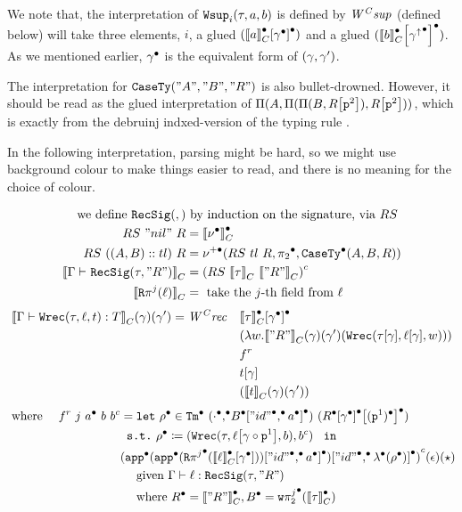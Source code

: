 We note that, the interpretation of $\texttt{Wsup}_{i}({\tau},{a},{b})$ is defined by $\mathit{W^Csup}$ (defined below) will take three elements, $i$, a glued $({{\llbracket {a} \rrbracket}_C^\bullet}\!\left[{{\gamma}^\bullet}\right]^\bullet)$ and a glued $({{\llbracket {b} \rrbracket}_C^\bullet}\!\left[{{{\gamma^\uparrow}^\bullet}}\right]^\bullet)$.  As we mentioned earlier, ${\gamma}^\bullet$ is the equivalent form of $(\gamma, \gamma')$.

The interpretation for $\texttt{CaseTy}({"A"},{"B"},{"R"})$ is also bullet-drowned. However, it should be read as the glued interpretation of $ \Pi({A},{\Pi({\Pi({B},{{R}\!\left[{\texttt{p}^{2}}\right]})},{{R}\!\left[{\texttt{p}^{2}}\right]})}) $, which is exactly from the debruinj indxed-version of the typing rule . 

In the following interpretation, parsing might be hard, so we might use background colour to make things easier to read, and there is no meaning for the choice of colour.

\begin{align*}
  \text{we define } \texttt{RecSig}({},{}) &\text{ by induction on the signature, via } RS \\
  RS~"nil"~R &= {\llbracket {\ensuremath{\nu^\bullet}} \rrbracket}_C^\bullet \\
  RS~((A, B) :: tl)~R &= \nu^{+\bullet}({RS~tl~R},{{\pi_2}^\bullet},{\texttt{CaseTy}^\bullet({A},{B},{R})}) \\ 
  {\llbracket {\ensuremath{ {\Gamma} \vdash_{} {\texttt{RecSig}({\tau},{"R"})} }} \rrbracket}_C &= {({RS~{\llbracket {\tau} \rrbracket}_C~{\llbracket {"R"} \rrbracket}_C})}^c \\
  {\llbracket {\ensuremath{\texttt{R}\pi^{j}({\ell})}} \rrbracket}_C &= \text{ take the $j$-th field from } \ell 
\end{align*}
\begin{align*}
  {\llbracket {\ensuremath{ {\Gamma} \vdash {\ensuremath{\texttt{Wrec}({\tau},{\ell},{t})}} : {T} }} \rrbracket}_C(\gamma)(\gamma') = \mathit{W^Crec} \quad &{{\llbracket {\ensuremath{\tau}} \rrbracket}_C^\bullet}\!\left[{{\gamma}^\bullet}\right]^\bullet \\ 
  & (\lambda w. {\llbracket {"R"} \rrbracket}_C(\gamma)(\gamma')(\texttt{Wrec}({{\tau}\!\left[{\gamma}\right]},{{\ell}\!\left[{\gamma}\right]},{w})))\\
  &f^r\\ &{t}\!\left[{\gamma}\right]\\ 
  &({\llbracket {t} \rrbracket}_C(\gamma)(\gamma')) 
\end{align*}
\begin{align*}  
  \text{ where } \quad f^r~j~{a}^\bullet~b~b^c &= 
  \texttt{let}~{\rho}^\bullet  \in {\texttt{Tm}}^\bullet~{({\cdot}^\bullet {,}^\bullet {\ensuremath{{B}^\bullet}}\!\left[{{{"id"}^\bullet},^\bullet{\ensuremath{{a}^\bullet}}}\right]^\bullet)}~{({{{R}^\bullet}\!\left[{{\gamma}^\bullet}\right]^\bullet}\!\left[{(\texttt{p}^{1})^{\bullet}}\right]^\bullet)} 
  \\
  &\texttt{ s.t.}~{\rho}^\bullet \coloneq (\texttt{Wrec}({\tau},{{\ell}\!\left[{{\gamma}\circ{\ensuremath{\texttt{p}^{1}}}}\right]},{b}),b^c)~\texttt{ in } \\
  & {({{\texttt{app}^\bullet({{\texttt{app}^\bullet({{{\texttt{R}\pi^{j}}}^\bullet({{{\llbracket {\ensuremath{\ell}} \rrbracket}_C^\bullet}\!\left[{{\gamma}^\bullet}\right]})})}\!\left[{{{"id"}^\bullet},^\bullet{\ensuremath{{a}^\bullet}}}\right]^\bullet})}\!\left[{{{"id"}^\bullet},^\bullet{\ensuremath{\lambda^\bullet({{\rho}^\bullet})}}}\right]^\bullet})}^c(\epsilon)(\star) \\
  & \quad 
   \text{ given }  {\ensuremath{\Gamma}} \vdash {\ensuremath{\ell}} : {\texttt{RecSig}({\tau},{"R"})}  \\
   & \quad \text{ where }{R}^\bullet = {\llbracket {"R"} \rrbracket}_C^\bullet, {B}^\bullet = {{\texttt{w}\pi^{j}_{\texttt{2}}}}^\bullet({{\llbracket {\ensuremath{\tau}} \rrbracket}_C^\bullet})
\end{align*}

